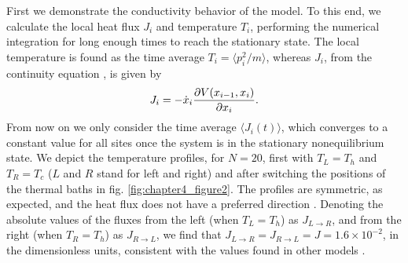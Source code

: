 First we demonstrate the conductivity behavior of the model.
To this end, we calculate the local heat flux $J_i$ and temperature $T_i$, performing the numerical integration
for long enough times to reach the stationary state.
The local temperature is found as the time average $T_i= \langle p_i^2 / m \rangle$, whereas
$J_i$,  from the continuity equation
\cite{Hu1998}, is given by
%
\begin{equation}
\label{heatflux}
J_i=-\dot x_i {{\partial V(x_{i-1},x_{i})} \over {\partial x_i}}.
\end{equation}
%
From now on we only consider the time average $\langle J_i (t)\rangle$, which converges to a constant value for all sites once the system is in the stationary nonequilibrium state. We depict the temperature profiles, for $N=20$, first with $T_L=T_h$ and $T_R=T_c$
($L$ and $R$ stand for left and right) and after switching the positions of the thermal baths in fig. \ref{fig:chapter4_figure2}. The profiles are symmetric, as expected, and the heat flux does not have a preferred direction  \cite{Hu1998,Terraneo2002}. Denoting the absolute values of the fluxes from the left (when $T_L=T_h$) as
$J_{L\rightarrow R}$, and from the right (when $T_R=T_h$) as
$J_{R\rightarrow L}$, we find that $J_{L\rightarrow R}=J_{R\rightarrow L}=J=1.6\times 10^{-2}$, in the dimensionless units, consistent with the values found in other models \cite{Terraneo2002,Hu1998}.
